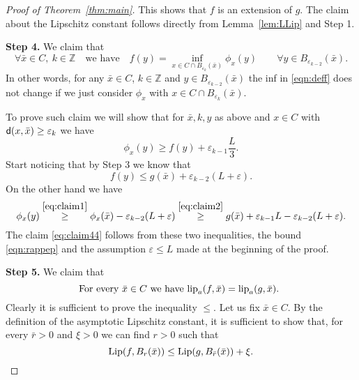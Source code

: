 \documentclass[9pt,reqno]{amsart}
\newcommand{\sfd}{{\sf d}}
\def\lipa#1#2{{\rm lip}_a (#1,#2)}
\def\ep{\varepsilon}
\begin{document}
\begin{proof}[Proof of Theorem~\ref{thm:main}]
This shows that $f$ is an extension of $g$. The claim about the Lipschitz constant  follows directly from Lemma~\ref{lem:LLip} and Step 1.


\vspace{10pt}


\noindent \textbf{Step 4.}  We claim that
\begin{equation}
\label{eq:claim4}
\forall\bar x\in C,\ k\in\mathbb Z\quad\text{we have}\quad f(y)  = \inf_{x\in C \cap B_{\ep_{k}}(\bar{x}) }   \phi_x(y)  \qquad \forall y \in B_{\ep_{k-2}}(\bar{x}).
\end{equation}
In other words, for any   $\bar{x} \in C$, $k\in\mathbb Z$  and   $y \in B_{\ep_{k-2}}(\bar{x})$ the inf in \eqref{eqn:deff} does not change if we just consider $\phi_x$ with $x \in C \cap B_{\ep_{k}}(\bar{x})$.

To prove such claim we will show that for $\bar x,k,y$ as above and $x\in C$ with $\sfd(x,\bar x)\geq \ep_k$ we have 
\begin{equation}
\label{eq:claim44}
\phi_x(y)\geq f(y)+\ep_{k-1}\frac L3.
\end{equation}
Start noticing that by Step 3 we know that
\[
f(y) \leq g(\bar{x})+ \ep_{k-2} (L+\ep).
\]
On the other hand we have
$$\phi_x(y) \stackrel{\eqref{eq:claim1}}\geq \phi_x(\bar{x}) - \ep_{k-2}(L+\ep) \stackrel{\eqref{eq:claim2}}\geq g(\bar x) + \ep_{k-1} L - \ep_{k-2}(L+\ep).$$
The claim \eqref{eq:claim44} follows from these two inequalities, the bound  \eqref{eqn:rappep}  and the assumption $\ep\leq L$ made at the beginning of the proof.

\vspace{10pt}


\noindent \textbf{Step 5.} We claim that
\begin{equation}
\label{eq:claim5}
\text{For every $\bar x \in C$ we have $\lipa{f}{\bar x}=\lipa{g}{\bar x}$.  }
\end{equation}
Clearly it is sufficient to prove the inequality $\leq$. Let us fix $\bar x \in C$. By the definition of the asymptotic Lipschitz constant, it is sufficient to show that, for every $\bar{r}>0$ and $\xi>0$ we can find $r>0$ such that 
\begin{equation}
\label{eq:concl}
{\rm Lip} (f, B_r(\bar x)) \leq {\rm Lip} ( g, B_{\bar r}(\bar x)) + \xi.
\end{equation}


\end{proof}
\end{document}
